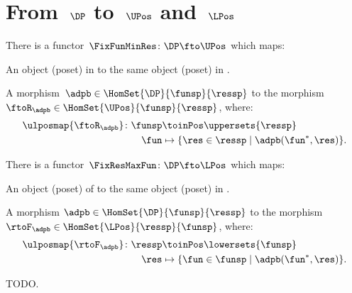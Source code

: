   

\section{From~$\DP$ to~$\UPos$ and~$\LPos$}
\begin{lemma}
\label{lem:covfunctor}
There is a functor~$\FixFunMinRes\colon \DP \fto \UPos$ which maps:
\begin{compactenum}
\item An object (poset) in \DP to the same object (poset) in \UPos.
\item A morphism~$\adpb\in \HomSet{\DP}{\funsp}{\ressp}$ to the morphism~$\ftoR_{\adpb}\in \HomSet{\UPos}{\funsp}{\ressp}$, where:
\begin{equation}
\begin{aligned}
    \ulposmap{\ftoR_{\adpb}}\colon \funsp &\toinPos \uppersets{\ressp}\\
    \fun&\mapsto \{\res \in \ressp\mid \adpb(\fun^*,\res)\}.
\end{aligned}
\end{equation}
\end{compactenum}
\end{lemma}

\begin{lemma}
\label{lem:confunctor}
There is a functor~$\FixResMaxFun\colon \DP \fto \LPos$ which maps:
\begin{compactenum}
\item An object (poset) of \DP to the same object (poset) in \LPos.
\item A morphism $\adpb \in \HomSet{\DP}{\funsp}{\ressp}$ to the morphism~$\rtoF_\adpb\in \HomSet{\LPos}{\ressp}{\funsp}$, where:
\begin{equation*}
    \begin{aligned}
    \ulposmap{\rtoF_\adpb}\colon \ressp &\toinPos \lowersets{\funsp}\\
    \res&\mapsto \{ \fun \in \funsp \mid \adpb(\fun^*,\res)\}.
    \end{aligned}
\end{equation*}
\end{compactenum}
\end{lemma}

\begin{marginfigure}
\begin{center}
\end{center}
    \caption{TODO.}
\end{marginfigure}


